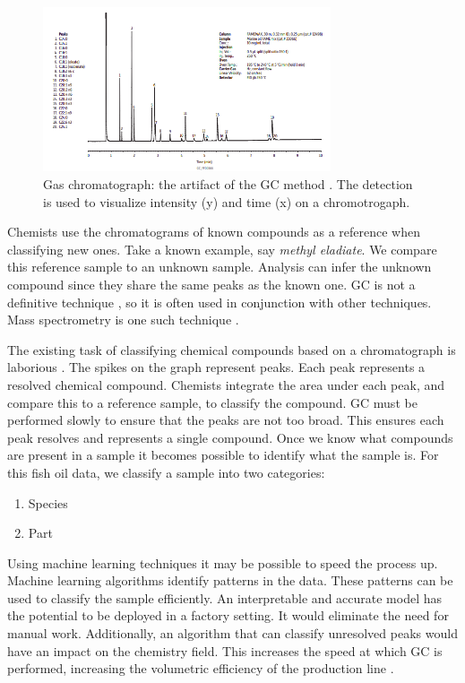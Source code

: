 \documentclass{article}
\begin{document}
\begin{figure}[htb]
  \centering
  \includegraphics[width=8.5cm]{chromatograph.png}
  \caption{
    Gas chromatograph: the artifact of the GC method \cite{restek2018high}.
    The detection is used to visualize intensity (y) and time (x) on a chromotrogaph.}
  \label{fig:gas-chromatography}
\end{figure}

Chemists use the chromatograms of known compounds as a reference when classifying new ones.
Take a known example, say \emph{methyl eladiate}.
We compare this reference sample to an unknown sample.
Analysis can infer the unknown compound since they share the same peaks as the known one.
GC is not a definitive technique \cite{khan2013gas}, so it is often used in conjunction with other techniques.
Mass spectrometry is one such technique \cite{restek2018high}.

The existing task of classifying chemical compounds based on a chromatograph is laborious \cite{eder1995gas,restek2018high}.
The spikes on the graph represent peaks.
Each peak represents a resolved chemical compound.
Chemists integrate the area under each peak, and compare this to a reference sample, to classify the compound.
GC must be performed slowly to ensure that the peaks are not too broad.
This ensures each peak resolves and represents a single compound.
Once we know what compounds are present in a sample it becomes possible to identify what the sample is.
For this fish oil data, we classify a sample into two categories:

\begin{enumerate}
  \item Species
  \item Part
\end{enumerate}

Using machine learning techniques it may be possible to speed the process up.
Machine learning algorithms identify patterns in the data.
These patterns can be used to classify the sample efficiently.
An interpretable and accurate model has the potential to be deployed in a factory setting.
It would eliminate the need for manual work.
Additionally, an algorithm that can classify unresolved peaks would have an impact on the chemistry field.
This increases the speed at which GC is performed, increasing the volumetric efficiency of the production line \cite{musk2020battery}.
\end{document}
